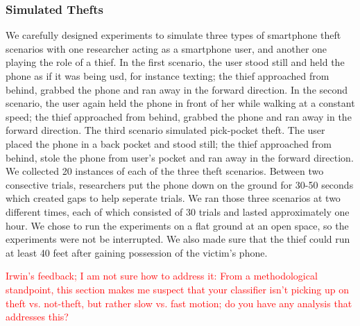 \subsubsection{Simulated Thefts}
We carefully designed experiments to simulate three types of smartphone theft scenarios with one researcher acting as a smartphone user, and another one playing the role of a thief. In the first scenario, the user stood still and held the phone as if it was being usd, for instance texting; the thief approached from behind, grabbed the phone and ran away in the forward direction. In the second scenario, the user again held the phone in front of her while walking at a constant speed; the thief approached from behind, grabbed the phone and ran away in the forward direction. The third scenario simulated pick-pocket theft. The user placed the phone in a back pocket and stood still; the thief approached from behind, stole the phone from user's pocket and ran away in the forward direction. \\
We collected 20 instances of each of the three theft scenarios. Between two consective trials, researchers put the phone down on the ground for 30-50 seconds which created gaps to help seperate trials. We ran those three scenarios at two different times, each of which consisted of 30 trials and lasted approximately one hour. We chose to run the experiments on a flat ground at an open space, so the experiments were not be interrupted. We also made sure that the thief could run at least 40 feet after gaining possession of the victim's phone.

\textcolor{red}{Irwin's feedback; I am not sure how to address it: From a methodological standpoint, this section makes me suspect that your classifier isn't picking up on theft vs. not-theft, but rather slow vs. fast motion; do you have any analysis that addresses this?}


